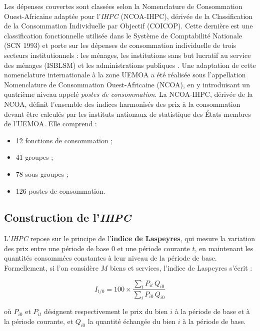 \documentclass[
12pt,          %
a4paper,       %
oneside,       %
openright      %
]{report}
\newcommand{\IHPC}{\textit{IHPC}}
\begin{document}
	Les dépenses couvertes sont classées selon la Nomenclature de 
	Consommation Ouest-Africaine adaptée pour l'\IHPC{} (NCOA-IHPC), 
	dérivée de la Classification de la Consommation Individuelle par 
	Objectif (COICOP). Cette dernière est une classification fonctionnelle 
	utilisée dans le Système de Comptabilité Nationale (SCN 1993) et porte 
	sur les dépenses de consommation individuelle de trois secteurs 
	institutionnels : les ménages, les institutions sans but lucratif au 
	service des ménages (ISBLSM) et les administrations publiques 
	\citep{afristat2022ncoa}.
	Une adaptation de cette nomenclature internationale à la zone UEMOA 
	a été réalisée sous l'appellation Nomenclature de Consommation 
	Ouest-Africaine (NCOA), en y introduisant un quatrième niveau appelé 
	\textit{postes de consommation}. La NCOA-IHPC, dérivée de la NCOA, 
	définit l'ensemble des indices harmonisés des prix à la consommation 
	devant être calculés par les instituts nationaux de statistique des 
	États membres de l'UEMOA. Elle comprend \citep{afristat2022ncoa} :
	\begin{itemize}
		\item 12 fonctions de consommation ;
		\item 41 groupes ;
		\item 78 sous-groupes ;
		\item 126 postes de consommation.
	\end{itemize}
	
		
	
\subsection{Construction de l'\IHPC{}}

L'\IHPC{} repose sur le principe de l'\textbf{indice de Laspeyres}, 
qui mesure la variation des prix entre une période de base $0$ et une 
période courante $t$, en maintenant les quantités consommées constantes 
à leur niveau de la période de base. Formellement, si l'on considère 
$M$ biens et services, l'indice de Laspeyres s'écrit \citep{afristat2022} :

\begin{equation}
	I_{t/0} = 100 \times \frac{\displaystyle\sum_{i} P_{it}\, Q_{i0}}
	{\displaystyle\sum_{i} P_{i0}\, Q_{i0}}
	\label{eq:laspeyres}
\end{equation}

où $P_{i0}$ et $P_{it}$ désignent respectivement le prix du bien $i$ 
à la période de base et à la période courante, et $Q_{i0}$ la quantité 
échangée du bien $i$ à la période de base.
\end{document}
